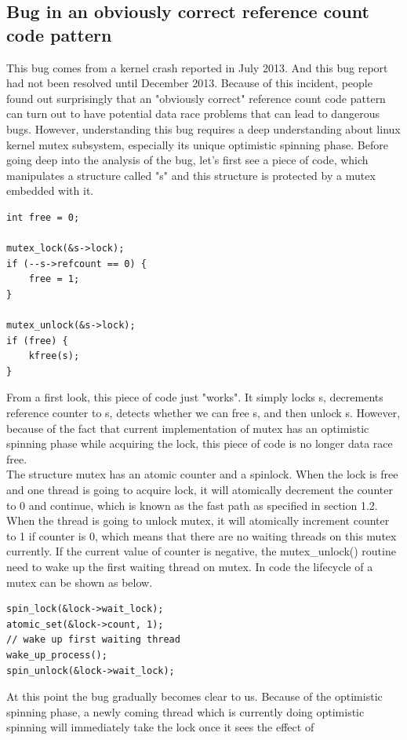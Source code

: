 \documentclass[10pt]{sigplanconf}
\begin{document}
\subsection{Bug in an obviously correct reference count code pattern}
This bug comes from a kernel crash reported in July 2013. And this bug report had not been resolved until December 2013. Because of this incident, people found out surprisingly that an "obviously correct" reference count code pattern can turn out to have potential data race problems that can lead to dangerous bugs. However, understanding this bug requires a deep understanding about linux kernel mutex subsystem, especially its unique optimistic spinning phase. Before going deep into the analysis of the bug, let's first see a piece of code, which manipulates a structure called "s" and this structure is protected by a mutex embedded with it. 
\lstset{language=C}
\begin{lstlisting}
int free = 0;

mutex_lock(&s->lock);
if (--s->refcount == 0) {
	free = 1;
}

mutex_unlock(&s->lock);
if (free) {
	kfree(s);
}

\end{lstlisting}
From a first look, this piece of code just "works". It simply locks s, decrements reference counter to s, detects whether we can free s, and then unlock s. However, because of the fact that current implementation of mutex has an optimistic spinning phase while acquiring the lock, this piece of code is no longer data race free. \\
The structure mutex has an atomic counter and a spinlock. When the lock is free and one thread is going to acquire lock, it will atomically decrement the counter to 0 and continue, which is known as the fast path as specified in section 1.2.\\
When the thread is going to unlock mutex, it will atomically increment counter to 1 if counter is 0, which means that there are no waiting threads on this mutex currently. If the current value of counter is negative, the mutex\_unlock() routine need to wake up the first waiting thread on mutex. In code the lifecycle of a mutex can be shown as below.
\begin{lstlisting}
spin_lock(&lock->wait_lock);
atomic_set(&lock->count, 1);
// wake up first waiting thread
wake_up_process(); 
spin_unlock(&lock->wait_lock);
\end{lstlisting}
At this point the bug gradually becomes clear to us. Because of the optimistic spinning phase, a newly coming thread which is currently doing optimistic spinning will immediately take the lock once it sees the effect of 
\end{document}
